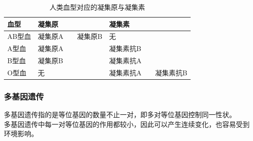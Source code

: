 \documentclass[UTF8]{ctexart}
\begin{document}
    \begin{table}[h]
        \begin{center}
            \begin{tabular}{l|l|l}
                \hline
                血型\qquad\qquad&凝集原\qquad\qquad\qquad\qquad&凝集素\qquad\qquad\qquad\qquad\\ \hline
                AB型血&凝集原A~~~~凝集原B\qquad\qquad&无\\ \hline
                A型血&凝集原A&凝集素抗B\\ \hline
                B型血&凝集原B&凝集素抗A\\ \hline
                O型血&无&凝集素抗A~~~~凝集素抗B\qquad\qquad\\ \hline
            \end{tabular}
            \caption{人类血型对应的凝集原与凝集素}
        \end{center}
    \end{table}\vspace{-20pt}

\subsubsection{多基因遗传}
    多基因遗传指的是等位基因的数量不止一对，即多对等位基因控制同一性状。\\[3mm]
    多基因遗传中每一对等位基因的作用都较小，因此可以产生连续变化，也容易受到环境影响。

\newpage
\end{document}
